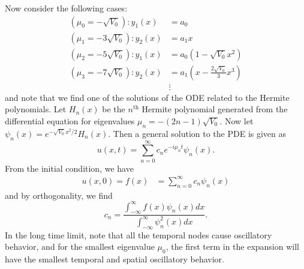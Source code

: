 \documentclass{article}
\begin{document}
\begin{itemize}
    Now consider the following cases:
    \begin{align*}
        (\mu_0 = -\sqrt{V_0}): y_1(x) &= a_0\\
        (\mu_1 = -3\sqrt{V_0}): y_2(x) &= a_1x\\
        (\mu_2 = -5\sqrt{V_0}): y_1(x) &= a_0(1 - \sqrt{V_0}x^2)\\
        (\mu_3 = -7\sqrt{V_0}): y_2(x) &= a_1(x - \frac{2\sqrt{V_0}}{3}x^3)\\
        &\vdots
    \end{align*}
    and note that we find one of the solutions of the ODE related to the Hermite polynomials. Let $H_n(x)$ be the $n^{\text{th}}$ Hermite polynomial generated from the differential equation for eigenvalues $\mu_n = -(2n-1)\sqrt{V_0}$. Now let $\psi_n(x) = e^{-\sqrt{V_0}x^2/2}H_n(x)$. Then a general solution to the PDE is given as 
    \[u(x,t) = \sum_{n = 0}^{\infty}c_ne^{-i\mu_nt}\psi_n(x).\]
    From the initial condition, we have
    \begin{align*}
        u(x,0) = f(x) &= \sum_{n = 0}^{\infty} c_n\psi_n(x)
    \end{align*}
    and by orthogonality, we find
    \[c_n = \frac{\int_{-\infty}^{\infty}f(x)\psi_n(x)dx}{\int_{-\infty}^{\infty}\psi_n^2(x)dx}.\]
    In the long time limit, note that all the temporal nodes cause oscillatory behavior, and for the smallest eigenvalue $\mu_0$, the first term in the expansion will have the smallest temporal and spatial oscillatory behavior.
\end{itemize}
\end{document}
